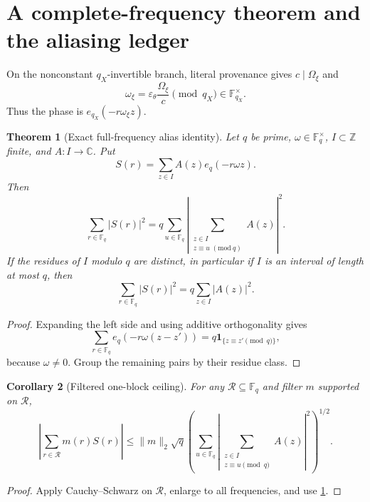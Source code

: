 \documentclass[11pt]{article}
\newtheorem{theorem}{Theorem}[section]
\newtheorem{corollary}[theorem]{Corollary}
\theoremstyle{definition}
\theoremstyle{remark}
\newcommand{\C}{\mathbb C}
\newcommand{\F}{\mathbb F}
\newcommand{\one}{\mathbf 1}
\begin{document}
\section{A complete-frequency theorem and the aliasing ledger}

On the nonconstant \(q_X\)-invertible branch, literal provenance
gives \(c\mid\Omega_\xi\) and
\[
 \omega_\xi
 =
 \varepsilon_\theta\frac{\Omega_\xi}{c}
 \pmod{q_X}
 \in\F_{q_X}^\times.
\]
Thus the phase is \(e_{q_X}(-r\omega_\xi z)\).

\begin{theorem}[Exact full-frequency alias identity]
\label{thm:full-frequency}
Let \(q\) be prime, \(\omega\in\F_q^\times\), \(I\subset\mathbb Z\)
finite, and \(A:I\to\C\).  Put
\[
 S(r)=\sum_{z\in I}A(z)e_q(-r\omega z).
\]
Then
\begin{equation}
 \boxed{
 \sum_{r\in\F_q}|S(r)|^2
 =
 q\sum_{u\in\F_q}
 \left|
 \sum_{\substack{z\in I\\z\equiv u\;(\mathrm{mod}\ q)}}
 A(z)
 \right|^2.}
\label{eq:alias-parseval}
\end{equation}
If the residues of \(I\) modulo \(q\) are distinct, in particular
if \(I\) is an interval of length at most \(q\), then
\begin{equation}
 \sum_{r\in\F_q}|S(r)|^2
 =
 q\sum_{z\in I}|A(z)|^2.
\label{eq:no-wrap-parseval}
\end{equation}
\end{theorem}

\begin{proof}
Expanding the left side and using additive orthogonality gives
\[
 \sum_{r\in\F_q}e_q(-r\omega(z-z'))
 =
 q\one_{\{z\equiv z'\pmod q\}},
\]
because \(\omega\ne0\).  Group the remaining pairs by their residue
class.
\end{proof}

\begin{corollary}[Filtered one-block ceiling]
\label{cor:filtered-ceiling}
For any \(\mathcal R\subseteq\F_q\) and filter \(m\) supported on
\(\mathcal R\),
\begin{equation}
 \left|\sum_{r\in\mathcal R}m(r)S(r)\right|
 \le
 \|m\|_2\sqrt q
 \left(
 \sum_{u\in\F_q}
 \left|\sum_{\substack{z\in I\\z\equiv u\pmod q}}A(z)\right|^2
 \right)^{1/2}.
\label{eq:filtered-ceiling}
\end{equation}
\end{corollary}

\begin{proof}
Apply Cauchy--Schwarz on \(\mathcal R\), enlarge to all frequencies,
and use \cref{thm:full-frequency}.
\end{proof}
\end{document}
